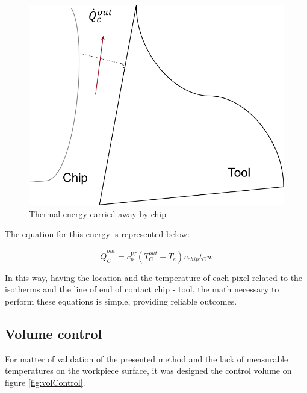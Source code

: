 			\begin{figure}[H]
				\centering
				\captionsetup{justification=centering}
				\includegraphics[scale=0.6]{Cap4/energyChip.png}
				\caption{Thermal energy carried away by chip}
				\label{fig:energychip}
			\end{figure}

			The equation for this energy is represented below:

			\begin{equation} 
			\label{eq_energychip}
				\dot{Q}_{C}^{out} = c_{p}^{W}(T_{C}^{out} - T_{e})v_{chip}t_{C}w
			\end{equation}

		In this way, having the location and the temperature of each pixel related to the isotherms and the line of end of contact chip - tool, the math necessary to perform these equations is simple, providing reliable outcomes.

	\subsection{Volume control}

		For matter of validation of the presented method and the lack of measurable temperatures on the workpiece surface, it was designed the control volume on figure \ref{fig:volControl}.

